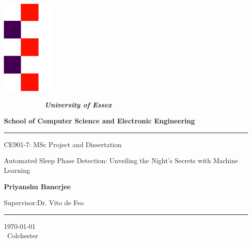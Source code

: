 \documentclass[12pt, a4paper,oneside]{book}
\numberwithin{equation}{section}
\begin{document}
\thispagestyle{empty}

\begin{minipage}{0.2\textwidth}
\centerline{\includegraphics[width=.4\textwidth]{essex} }
\end{minipage}
\begin{minipage}{0.8\textwidth}

$ \qquad \qquad \qquad ${\LARGE \bf \sl University of Essex}

{\LARGE \bf School of Computer Science and Electronic Engineering}

\end{minipage}

\begin{center}

\noindent\textcolor{myred}{\rule{\linewidth}{4.8pt}}

\vspace{1cm}

{\LARGE \sc  CE901-7: MSc Project and Dissertation}

\vspace{1.5cm}

{\Huge{\color{myblue}  Automated Sleep Phase Detection: Unveiling the Night's Secrets with Machine Learning}}

\vspace{1.5cm}

{\Large \bf Priyanshu Banerjee}




\vspace{2.0cm}


\vspace{1.5cm}

{\Large {Supervisor:Dr. Vito de Feo} }

\vspace{.25cm}

\noindent\textcolor{myred}{\rule{\linewidth}{4.8pt}}

\vspace{1cm}
{\Large \today }\\[4pt]\
{\Large Colchester}
\end{center}
\newpage
\tableofcontents
\end{document}
